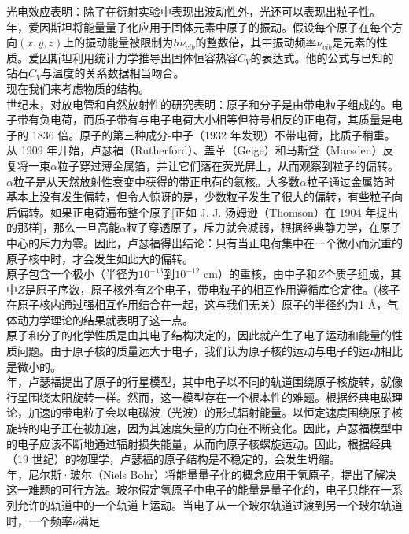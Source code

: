 	\indent 光电效应表明：除了在衍射实验中表现出波动性外，光还可以表现出粒子性。\\
	 年，爱因斯坦将能量量子化应用于固体元素中原子的振动。假设每个原子在每个方向$\left(x,y,z\right)$上的振动能量被限制为$h\nu_{vib}$的整数倍，其中振动频率$\nu_{vib}$是元素的性质。爱因斯坦利用统计力学推导出固体恒容热容$C_V$的表达式。他的公式与已知的钻石$C_V$与温度的关系数据相当吻合。\\
	\indent 现在我们来考虑物质的结构。\\
	 世纪末，对放电管和自然放射性的研究表明：原子和分子是由带电粒子组成的。电子带有负电荷，而质子带有与电子电荷大小相等但符号相反的正电荷，其质量是电子的 1836 倍。原子的第三种成分-中子（1932 年发现）不带电荷，比质子稍重。\\
	\indent 从 1909 年开始，卢瑟福（Rutherford）、盖革（Geige）和马斯登（Marsden）反复将一束$\alpha$粒子穿过薄金属箔，并让它们落在荧光屏上，从而观察到粒子的偏转。$\alpha$粒子是从天然放射性衰变中获得的带正电荷的氦核。大多数$\alpha$粒子通过金属箔时基本上没有发生偏转，但令人惊讶的是，少数粒子发生了很大的偏转，有些粒子向后偏转。如果正电荷遍布整个原子[正如 J. J. 汤姆逊（Thomson）在 1904 年提出的那样]，那么一旦高能$\alpha$粒子穿透原子，斥力就会减弱，根据经典静力学，在原子中心的斥力为零。因此，卢瑟福得出结论：只有当正电荷集中在一个微小而沉重的原子核中时，才会发生如此大的偏转。\\
	\indent 原子包含一个极小（半径为$10^{-13}$到$10^{-12}$ cm）的重核，由中子和$Z$个质子组成，其中$Z$是原子序数，原子核外有$Z$个电子，带电粒子的相互作用遵循库仑定律。(核子在原子核内通过强相互作用结合在一起，这与我们无关）原子的半径约为1 \AA，气体动力学理论的结果就表明了这一点。\\
	\indent 原子和分子的化学性质是由其电子结构决定的，因此就产生了电子运动和能量的性质问题。由于原子核的质量远大于电子，我们认为原子核的运动与电子的运动相比是微小的。\\
	 年，卢瑟福提出了原子的行星模型，其中电子以不同的轨道围绕原子核旋转，就像行星围绕太阳旋转一样。然而，这一模型存在一个根本性的难题。根据经典电磁理论，加速的带电粒子会以电磁波（光波）的形式辐射能量。以恒定速度围绕原子核旋转的电子正在被加速，因为其速度矢量的方向在不断变化。因此，卢瑟福模型中的电子应该不断地通过辐射损失能量，从而向原子核螺旋运动。因此，根据经典（19 世纪）的物理学，卢瑟福的原子结构是不稳定的，会发生坍缩。\\
	 年，尼尔斯·玻尔（Niels Bohr）将能量量子化的概念应用于氢原子，提出了解决这一难题的可行方法。玻尔假定氢原子中电子的能量是量子化的，电子只能在一系列允许的轨道中的一个轨道上运动。当电子从一个玻尔轨道过渡到另一个玻尔轨道时，一个频率$\nu$满足
